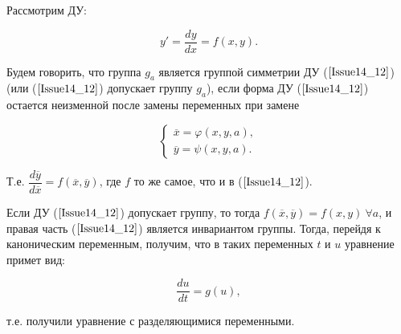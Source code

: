 Рассмотрим ДУ: 

\begin{equation}
	y' = \dfrac{dy}{dx} = f(x,y).
	\label{Issue14_12}
\end{equation}

Будем говорить, что группа $g_a$ является $\textbf{группой симметрии}$ ДУ ($\ref{Issue14_12}$) (или ($\ref{Issue14_12}$) допускает группу $g_a$), если форма ДУ ($\ref{Issue14_12}$) остается неизменной после замены переменных при замене 

\begin{equation}
	\begin{cases}
		\overline{x} = \varphi(x,y,a), \\
		\overline{y} = \psi(x,y,a).
	\end{cases}
\end{equation}

Т.е. $\dfrac{d\overline{y}}{d\overline{x}} = f(\overline{x}, \overline{y})$, где $f$ то же самое, что и в ($\ref{Issue14_12}$).

Если ДУ ($\ref{Issue14_12}$) допускает группу, то тогда $f(\overline{x}, \overline{y}) = f(x,y)\ \forall a$, и правая часть ($\ref{Issue14_12}$) является инвариантом группы. Тогда, перейдя к каноническим переменным, получим, что в таких переменных $t$ и $u$ уравнение примет вид:

\begin{equation}
	\dfrac{du}{dt} = g(u),
	\label{Issue14_13}
\end{equation}

т.е. получили уравнение с разделяющимися переменными.





